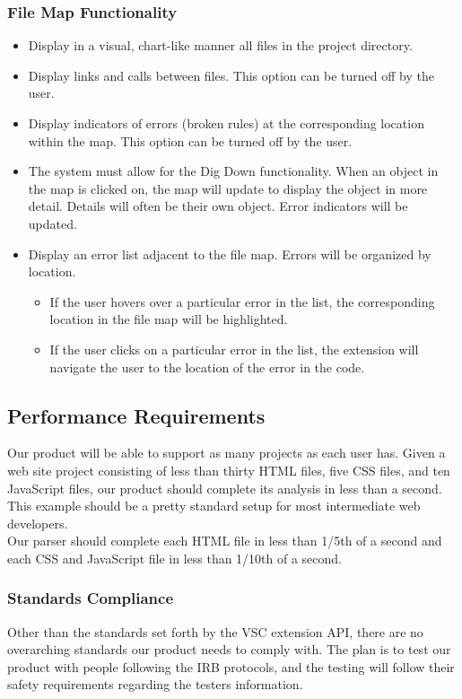 \documentclass[letterpaper,10pt,titlepage,draftclsnofoot,onecolumn,onesided] {IEEEtran}
\begin{document}
\subsubsection{File Map Functionality}
\begin{itemize}
	\item Display in a visual, chart-like manner all files in the project directory.
    \item Display links and calls between files. This option can be turned off by the user.
    \item Display indicators of errors (broken rules) at the corresponding location within the map. This option can be turned off by the user.
    \item The system must allow for the Dig Down functionality. When an object in the map is clicked on, the map will update to display the object in more detail. Details will often be their own object. Error indicators will be updated.
    \item Display an error list adjacent to the file map. Errors will be organized by location.
    \begin{itemize}
    	\item If the user hovers over a particular error in the list, the corresponding location in the file map will be 	highlighted.
        \item If the user clicks on a particular error in the list, the extension will navigate the user to the location of the error in the code.
    \end{itemize}
\end{itemize}

\subsection{Performance Requirements}
Our product will be able to support as many projects as each user has. 
Given a web site project consisting of less than thirty HTML files, five CSS files, and ten JavaScript files, our product should complete its analysis in less than a second. 
This example should be a pretty standard setup for most intermediate web developers.
\\
Our parser should complete each HTML file in less than 1/5th of a second and each CSS and JavaScript file in less than 1/10th of a second.

\subsubsection{Standards Compliance}
Other than the standards set forth by the VSC extension API, there are no overarching standards our product needs to comply with.
The plan is to test our product with people following the IRB protocols, and the testing will follow their safety requirements regarding the testers information.
\end{document}
